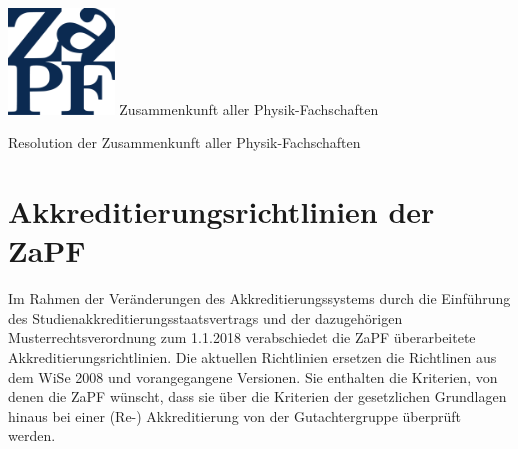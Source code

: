 \documentclass[DIV=calc]{scrartcl}
\begin{document}
    \hspace{0.87\textwidth}
    \begin{minipage}{120pt}
        \vspace{-1.8cm}
        \includegraphics[width=80pt]{logo.pdf}
        \centering
        \small Zusammenkunft aller Physik-Fachschaften
    \end{minipage}
    \begin{center}
        \huge{Resolution der Zusammenkunft aller Physik-Fachschaften}\vspace{.25\baselineskip}\\
        \normalsize
    \end{center}
   \vspace{0.5cm} 
\section*{Akkreditierungsrichtlinien der ZaPF}
Im Rahmen der Veränderungen des Akkreditierungssystems durch die Einführung des Studienakkreditierungsstaatsvertrags und der dazugehörigen Musterrechtsverordnung zum 1.1.2018 verabschiedet die ZaPF überarbeitete Akkreditierungsrichtlinien. Die aktuellen Richtlinien ersetzen die Richtlinen aus dem WiSe 2008 und vorangegangene Versionen. Sie enthalten die Kriterien, von denen die ZaPF wünscht, dass sie über die Kriterien der gesetzlichen Grundlagen hinaus bei einer (Re-) Akkreditierung von der Gutachtergruppe überprüft werden.
\end{document}
